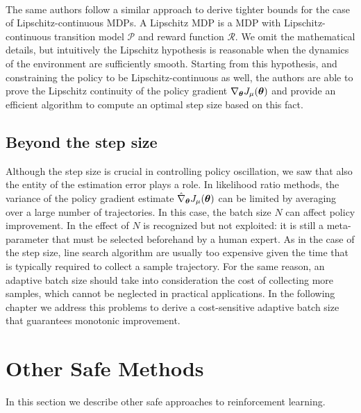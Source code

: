 \paragraph{} %
The same authors \cite{pirotta2015policy} follow a similar approach to derive tighter bounds for the case of Lipschitz-continuous \ac{MDP}s. A Lipschitz \ac{MDP} is a \ac{MDP} with Lipschitz-continuous transition model $\mathcal{P}$ and reward function $\mathcal{R}$. We omit the mathematical details, but intuitively the Lipschitz hypothesis is reasonable when the dynamics of the environment are sufficiently smooth. Starting from this hypothesis, and constraining the policy to be Lipschitz-continuous as well, the authors are able to prove the Lipschitz continuity of the policy gradient $\nabla_{\boldsymbol{\theta}}J_\mu(\boldsymbol{\theta})$ and provide an efficient algorithm to compute an optimal step size based on this fact.
 
\subsection{Beyond the step size}\label{sec:beyond}
Although the step size is crucial in controlling policy oscillation, we saw that also the entity of the estimation error plays a role. In likelihood ratio methods, the variance of the policy gradient estimate $\hat{\nabla}_{\boldsymbol{\theta}}J_{\mu}(\boldsymbol{\theta})$ can be limited by averaging over a large number of trajectories. In this case, the batch size $N$ can affect policy improvement. In \cite{NIPS2013_5186} the effect of $N$ is recognized but not exploited: it is still a meta-parameter that must be selected beforehand by a human expert. As in the case of the step size, line search algorithm are usually too expensive given the time that is typically required to collect a sample trajectory. For the same reason, an adaptive batch size should take into consideration the cost of collecting more samples, which cannot be neglected in practical applications. In the following chapter we address this problems to derive a cost-sensitive adaptive batch size that guarantees monotonic improvement.



\section{Other Safe Methods}
In this section we describe other safe approaches to reinforcement learning.

